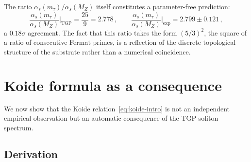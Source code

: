 \documentclass[11pt,a4paper]{article}
\newcommand{\as}{\alpha_s}
\newcommand{\MZ}{M_Z}
\newcommand{\mt}{m_\tau}
\begin{document}
The ratio $\as(\mt)/\as(\MZ)$ itself constitutes a parameter-free
prediction:
\begin{equation}
  \frac{\as(\mt)}{\as(\MZ)}\bigg|_{\mathrm{TGP}} = \frac{25}{9} = 2.778\,,
  \qquad
  \frac{\as(\mt)}{\as(\MZ)}\bigg|_{\mathrm{exp}} = 2.799 \pm 0.121\,,
\end{equation}
a $0.18\sigma$ agreement.  The fact that this ratio takes the form
$(5/3)^2$, the square of a ratio of consecutive Fermat primes, is a
reflection of the discrete topological structure of the substrate
rather than a numerical coincidence.

\section{Koide formula as a consequence}\label{sec:koide}

We now show that the Koide relation~\eqref{eq:koide-intro} is not
an independent empirical observation but an automatic consequence of
the TGP soliton spectrum.

\subsection{Derivation}
\end{document}
